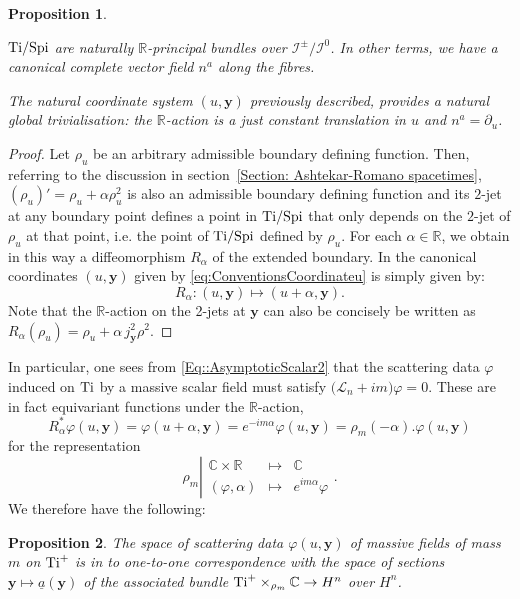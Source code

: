 \documentclass[a4paper, 10pt]{article}
\newtheorem{proposition}{Proposition}[section]
\theoremstyle{remark}
\newcommand{\Ti}{\textnormal{Ti}}
\newcommand{\Spi}{\textnormal{Spi}}
\newcommand{\y}{\bm{y}}
\newcommand{\R}{\mathbb{R}}
\begin{document}
\begin{proposition}\mbox{} \label{Proposition: principal bundle}

$\Ti/\Spi$ are naturally $\mathbb{R}$-principal bundles over $\mathcal{I}^{\pm}/\mathcal{I}^{0}$. In other terms, we have a canonical complete vector field $n^{a}$ along the fibres.
 
The natural coordinate system $(u,\bm{y})$ previously described, provides a natural global trivialisation: the $\mathbb{R}$-action is a just constant translation in $u$ and $n^{a} = \partial_u$.
\end{proposition}
\begin{proof}\mbox{}
Let $\rho_u$ be an arbitrary admissible boundary defining function. Then, referring to the discussion in section~\ref{Section: Ashtekar-Romano spacetimes}, $(\rho_u)'=\rho_u + \alpha \rho_u^2$ is also an admissible boundary defining function and its $2$-jet at any boundary point defines a point in $\Ti/\Spi$ that only depends on the $2$-jet of $\rho_u$ at that point, i.e. the point of $\Ti/\Spi$ defined by $\rho_u$. For each $\alpha \in \R$, we obtain in this way a diffeomorphism $R_\alpha$ of the extended boundary. In the canonical coordinates $(u,\bm{y})$ given by \eqref{eq:ConventionsCoordinateu} is simply given by:
\[ R_\alpha: (u,\bm{y}) \mapsto (u+\alpha, \bm{y}).\]
Note that the $\mathbb{R}$-action on the 2-jets at $\y$ can also be concisely be written as $R_\alpha (\rho_u) = \rho_u + \alpha \,j^2_{\y} \rho^2$. 
\end{proof}

In particular, one sees from \eqref{Eq::AsymptoticScalar2} that the scattering data $\varphi$ induced on $\Ti$ by a massive scalar field must satisfy $\big(\mathcal{L}_n + i m \big) \varphi =0$. These are in fact equivariant functions under the $\mathbb{R}$-action, 
\begin{equation}
    R_{\alpha}^*\varphi(u,\y) = \varphi(u+\alpha,\y) = e^{-im \alpha}\varphi(u,\y) = \rho_m(-\alpha) . \varphi(u,\y)
\end{equation}
for the representation 
\begin{equation}
    \rho_{m} \left|\begin{array}{ccc}
       \mathbb{C} \times \mathbb{R}  & \mapsto &  \mathbb{C}  \\
        (\varphi , \alpha)  &\mapsto & e^{i m \alpha} \varphi
    \end{array}\right..
\end{equation}
We therefore have the following:
 \begin{proposition}\label{Proposition: scattering data are sections}
     The space of scattering data $\varphi(u,\y)$ of massive fields of mass $m$ on $\Ti^+$ is in to one-to-one correspondence with the space of sections $\y \mapsto \underline{a}(\y)$ of the associated bundle $\Ti^+ \times_{\rho_m} \mathbb{C} \to H^n$ over $H^n$.
 \end{proposition}
\end{document}
